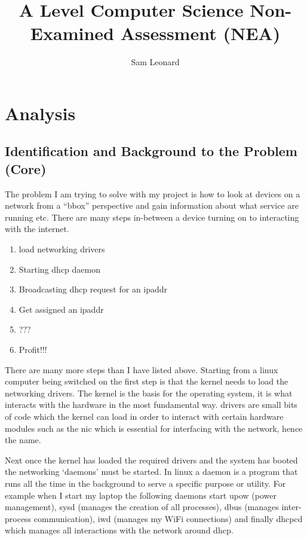 \documentclass[titlepage]{article}
\author{Sam Leonard}
\title{A Level Computer Science Non-Examined Assessment (NEA)}
\date{} %
\let\Oldsection\section{}
\renewcommand{\section}{\FloatBarrier\Oldsection}
\let\Oldsubsection\subsection{}
\renewcommand{\subsection}{\FloatBarrier\Oldsubsection}
\begin{document}
\maketitle

\tableofcontents

\section{Analysis}

\subsection{Identification and Background to the Problem (Core)}

The problem I am trying to solve with my project is how to look at devices on a network
from a ``\gls{bbox}'' perspective and gain information about what service are running etc.
There are many steps in-between a device turning on to interacting with the internet.

\begin{enumerate}
  \item{load networking \glspl{driver}}
  \item{Starting \gls{dhcp} \gls{daemon}}
  \item{Broadcasting \gls{dhcp} request for an \gls{ipaddr}}
  \item{Get assigned an \gls{ipaddr}}
  \item{???}
  \item{Profit!!!}
\end{enumerate}

There are many more steps than I have listed above. Starting from a linux computer being switched on
the first step is that the \gls{kernel} needs to load the networking \glspl{driver}. The \gls{kernel} is the basis for the
operating system, it is what interacts with the hardware in the most fundamental way. \glspl{driver} are small
bits of code which the \gls{kernel} can load in order to interact with certain hardware modules such as the
\gls{nic} which is essential for interfacing with the network, hence the name.

Next once the \gls{kernel} has loaded the required \glspl{driver} and the system has booted the networking
`\glspl{daemon}' must be started. In linux a \gls{daemon} is a program that runs all the time in the background
to serve a specific purpose or utility. For example when I start my laptop the following \glspl{daemon} start
\gls{upow} (power management), \gls{sysd} (manages the creation of all processes), \gls{dbus} (manages
inter-process communication), iwd (manages my WiFi connections) and finally \gls{dhcpcd} which manages all
interactions with the network around \gls{dhcp}.
\end{document}
